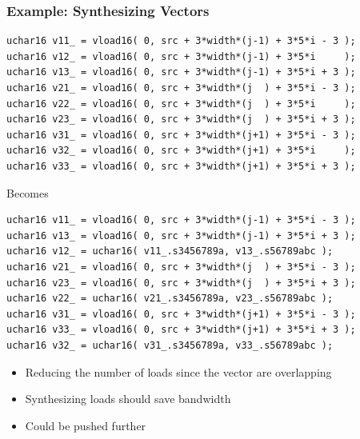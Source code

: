 \documentclass{beamer}
\begin{document}
\begin{frame}[fragile]
  \frametitle{Example: Synthesizing Vectors}
\tiny
\begin{lstlisting}
uchar16 v11_ = vload16( 0, src + 3*width*(j-1) + 3*5*i - 3 );
uchar16 v12_ = vload16( 0, src + 3*width*(j-1) + 3*5*i     );
uchar16 v13_ = vload16( 0, src + 3*width*(j-1) + 3*5*i + 3 );
uchar16 v21_ = vload16( 0, src + 3*width*(j  ) + 3*5*i - 3 );
uchar16 v22_ = vload16( 0, src + 3*width*(j  ) + 3*5*i     );
uchar16 v23_ = vload16( 0, src + 3*width*(j  ) + 3*5*i + 3 );
uchar16 v31_ = vload16( 0, src + 3*width*(j+1) + 3*5*i - 3 );
uchar16 v32_ = vload16( 0, src + 3*width*(j+1) + 3*5*i     );
uchar16 v33_ = vload16( 0, src + 3*width*(j+1) + 3*5*i + 3 );
\end{lstlisting}
\normalsize
\centering Becomes
\tiny
\begin{lstlisting}
uchar16 v11_ = vload16( 0, src + 3*width*(j-1) + 3*5*i - 3 );
uchar16 v13_ = vload16( 0, src + 3*width*(j-1) + 3*5*i + 3 );
uchar16 v12_ = uchar16( v11_.s3456789a, v13_.s56789abc );
uchar16 v21_ = vload16( 0, src + 3*width*(j  ) + 3*5*i - 3 );
uchar16 v23_ = vload16( 0, src + 3*width*(j  ) + 3*5*i + 3 );
uchar16 v22_ = uchar16( v21_.s3456789a, v23_.s56789abc );
uchar16 v31_ = vload16( 0, src + 3*width*(j+1) + 3*5*i - 3 );
uchar16 v33_ = vload16( 0, src + 3*width*(j+1) + 3*5*i + 3 );
uchar16 v32_ = uchar16( v31_.s3456789a, v33_.s56789abc );
\end{lstlisting}
\begin{itemize}
\item Reducing the number of loads since the vector are overlapping
\item Synthesizing loads should save bandwidth
\item Could be pushed further
\end{itemize}
\end{frame}
\end{document}
